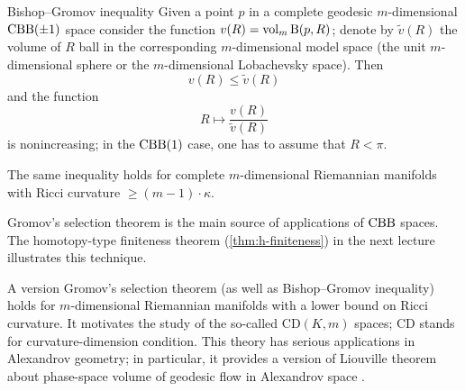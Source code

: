 \begin{thm}{Bishop--Gromov inequality}
Given a point $p$ in a complete geodesic $m$-dimensional $\mathrm{CBB}(\pm1)$ space consider the function $v(R)\z=\vol_m\oBall(p,R)$;
denote by $\tilde v(R)$ the volume of $R$ ball in the corresponding $m$-dimensional model space (the unit $m$-dimensional sphere or the $m$-dimensional Lobachevsky space).
Then 
\[v(R)\le \tilde v(R)\]
and the function 
\[R\mapsto \frac{v(R)}{\tilde v(R)}\] is nonincreasing;
in the $\mathrm{CBB}(1)$ case, one has to assume that $R<\pi$.
\end{thm}

The same inequality holds for complete $m$-dimensional Riemannian manifolds with Ricci curvature $\ge (m-1)\cdot \kappa$.

Gromov's selection theorem is the main source of applications of $\mathrm{CBB}$ spaces.
The homotopy-type finiteness theorem (\ref{thm:h-finiteness}) in the next lecture illustrates this technique.

A version Gromov's selection theorem (as well as Bishop--Gromov inequality) holds for $m$-dimensional Riemannian manifolds with a lower bound on Ricci curvature.
It motivates the study of the so-called $\mathrm{CD}(K,m)$ spaces; $\mathrm{CD}$ stands for curvature-dimension condition.
This theory has serious applications in Alexandrov geometry;
in particular, it provides a version of Liouville theorem about phase-space volume of geodesic flow in Alexandrov space \cite{brue-mondino-semola}.
